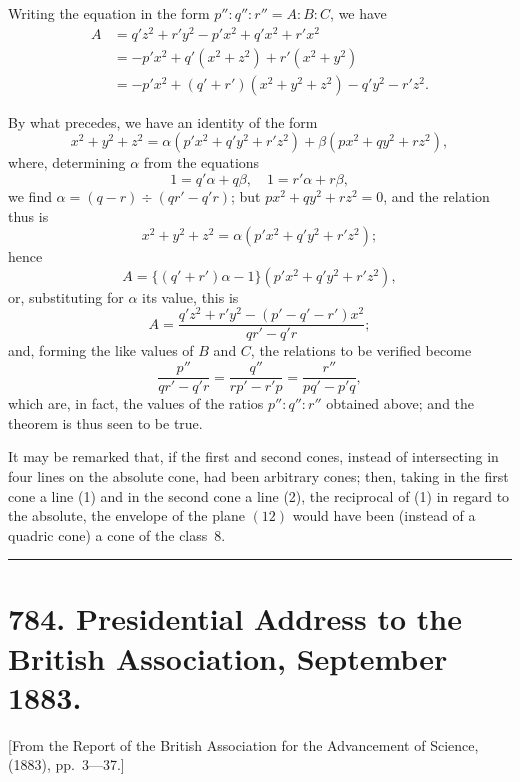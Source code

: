 \documentclass[11pt,a4paper]{article}
\begin{document}
Writing the equation in the form $p'':q'':r'' = A:B:C$,
we have
\begin{align*}
A &= q'z^2 + r'y^2 - p'x^2 + q'x^2 + r'x^2\\
&= -p'x^2 + q'(x^2+z^2) + r'(x^2+y^2)\\
&= -p'x^2 + (q'+r')(x^2+y^2+z^2) - q'y^2 - r'z^2.
\end{align*}

By what precedes, we have an identity of the form
\[
x^2 + y^2 + z^2 = \alpha(p'x^2 + q'y^2 + r'z^2) + \beta(px^2 + qy^2 + rz^2),
\]
where, determining $\alpha$ from the equations
\[
1 = q'\alpha + q\beta,\quad 1 = r'\alpha + r\beta,
\]
we find $\alpha = (q-r) \div (qr' - q'r)$; but $px^2 + qy^2 + rz^2 = 0$, and the
relation thus is
\[
x^2 + y^2 + z^2 = \alpha(p'x^2 + q'y^2 + r'z^2);
\]
hence
\[
A = \{(q'+r')\alpha - 1\}(p'x^2 + q'y^2 + r'z^2),
\]
or, substituting for $\alpha$ its value, this is
\[
A = \frac{q'z^2 + r'y^2 - (p'-q'-r')x^2}{qr'-q'r};
\]
and, forming the like values of $B$ and $C$, the relations to be verified become
\[
\frac{p''}{qr'-q'r} = \frac{q''}{rp'-r'p} = \frac{r''}{pq'-p'q},
\]
which are, in fact, the values of the ratios $p'':q'':r''$ obtained above; and
the theorem is thus seen to be true.

It may be remarked that, if the first and second cones, instead of
intersecting in four lines on the absolute cone, had been arbitrary cones;
then, taking in the first cone a line (1) and in the second cone a line (2),
the reciprocal of (1) in regard to the absolute, the envelope of the plane
$(12)$ would have been (instead of a quadric cone) a cone of the class~8.

\vspace{12pt}
\hrule
\vspace{12pt}

\section*{784. Presidential Address to the British Association, September 1883.}

\begin{flushright}
\small[From the Report of the British Association for the Advancement of Science, (1883), pp.~3---37.]
\end{flushright}
\end{document}
